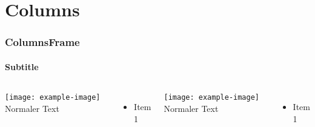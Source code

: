 \documentclass{beamer}
\begin{document}
\section{Columns}

\begin{frame}
  \frametitle{ColumnsFrame}
  \framesubtitle{Subtitle}
  \begin{columns}[onlytextwidth]
    \texttt{[image: example-image]}
    Normaler Text
    \begin{itemize}
      \item<1->{Item 1}
    \end{itemize}
    \texttt{[image: example-image]}
    Normaler Text
    \begin{itemize}
      \item<1->{Item 1}
    \end{itemize}
  \end{columns}
\end{frame}
\end{document}
